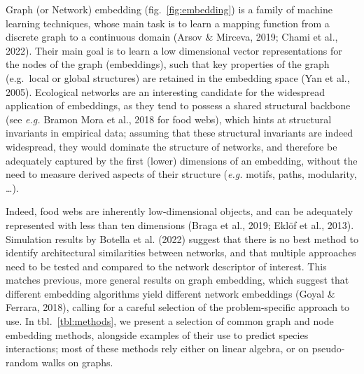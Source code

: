 \documentclass[10pt,oneside]{article}
\begin{document}
Graph (or Network) embedding (fig.~\ref{fig:embedding}) is a family of
machine learning techniques, whose main task is to learn a mapping
function from a discrete graph to a continuous domain (Arsov \& Mirceva,
2019; Chami et al., 2022). Their main goal is to learn a low dimensional
vector representations for the nodes of the graph (embeddings), such
that key properties of the graph (e.g.~local or global structures) are
retained in the embedding space (Yan et al., 2005). Ecological networks
are an interesting candidate for the widespread application of
embeddings, as they tend to possess a shared structural backbone (see
\emph{e.g.} Bramon Mora et al., 2018 for food webs), which hints at
structural invariants in empirical data; assuming that these structural
invariants are indeed widespread, they would dominate the structure of
networks, and therefore be adequately captured by the first (lower)
dimensions of an embedding, without the need to measure derived aspects
of their structure (\emph{e.g.} motifs, paths, modularity, \ldots).

Indeed, food webs are inherently low-dimensional objects, and can be
adequately represented with less than ten dimensions (Braga et al.,
2019; Eklöf et al., 2013). Simulation results by Botella et al. (2022)
suggest that there is no best method to identify architectural
similarities between networks, and that multiple approaches need to be
tested and compared to the network descriptor of interest. This matches
previous, more general results on graph embedding, which suggest that
different embedding algorithms yield different network embeddings (Goyal
\& Ferrara, 2018), calling for a careful selection of the
problem-specific approach to use. In tbl.~\ref{tbl:methods}, we present
a selection of common graph and node embedding methods, alongside
examples of their use to predict species interactions; most of these
methods rely either on linear algebra, or on pseudo-random walks on
graphs.
\end{document}
